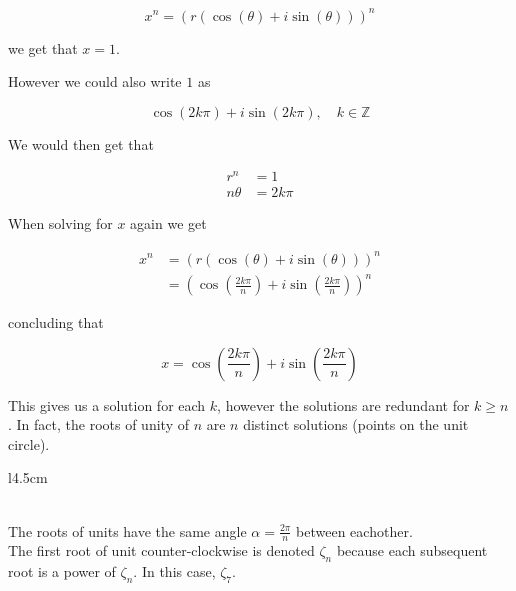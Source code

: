 \documentclass{article}
\begin{document}
\[
	x^n = \left(r\left(\cos(\theta) + i\sin(\theta)\right)\right)^n
\]

we get that \(x=1\).

However we could also write \(1\) as

\[
	\cos(2k\pi) + i\sin(2k\pi), \quad k\in \mathbb{Z}
\]

We would then get that

\begin{align*}
	r^n&=1 \\
	n\theta&=2k\pi
\end{align*}

When solving for \(x\) again we get

\begin{align*}
	x^n &= \left(r\left(\cos(\theta) + i\sin(\theta)\right)\right)^n
	\\
	&= \left(\cos\left(\frac{2k\pi}{n}\right) + i\sin\left(\frac{2k\pi}{n}\right)\right)^n
\end{align*}

concluding that

\[
	x = \cos\left(\frac{2k\pi}{n}\right) + i\sin\left(\frac{2k\pi}{n}\right)
\]

This gives us a solution for each \(k\), however the solutions are redundant for \(k \geq n\).
In fact, the roots of unity of \(n\) are \(n\) distinct solutions (points on the unit circle).

\def\n{7}
\begin{wrapfigure}[4]{l}{4.5cm} %
\end{wrapfigure}

\phantom{ }\\
    
The roots of units have the same angle \(\alpha = \frac{2\pi}{n}\) between eachother.
\\
The first root of unit counter-clockwise is denoted \(\zeta_n\) because each subsequent
root is a power of \(\zeta_n\). In this case, \(\zeta_\n\).
\end{document}
